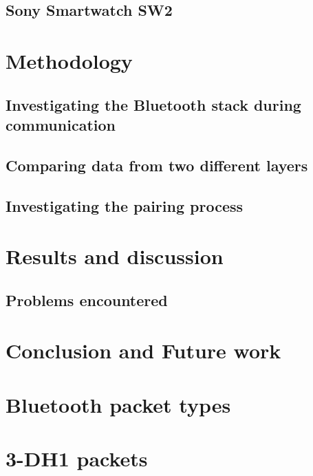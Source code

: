 \documentclass{article}
\begin{document}
	\subsection{Sony Smartwatch SW2} %
	
\newpage
\section{Methodology}		%
 
	\subsection{Investigating the Bluetooth stack during communication}
				
		
	\subsection{Comparing data from two different layers}	%
		
	
	\subsection{Investigating the pairing process}
		
\newpage
\section{Results and discussion}

		
		\newpage
		\subsection{Problems encountered}
		
\newpage
\section{Conclusion and Future work}


\newpage



{}


\appendix
\section{Bluetooth packet types}
\label{app:types}

\section{3-DH1 packets}
\label{app:roguepackets}

\end{document}

